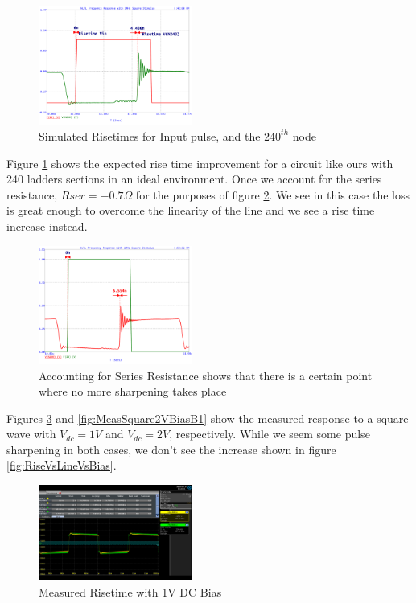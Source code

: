 \documentclass[journal]{IEEEtran} \usepackage[english]{babel}
\begin{document}
\begin{figure}[htb]
\centering
\includegraphics[width=0.45\textwidth]{Probed_Input_N10_N240_NoSeriesResistance}
\caption{Simulated Risetimes for Input pulse, and the $240^{th}$ node}
\label{fig:probedNoResistance}
\end{figure}

Figure \ref{fig:probedNoResistance} shows the expected rise time improvement for
a circuit like ours with 240 ladders sections in an ideal environment. Once we
account for the series resistance, $Rser = -0.7\Omega$ for the purposes of
figure \ref{fig:probedWithResistance}. We see in this case the loss is great
enough to overcome the linearity of the line and we see a rise time increase
instead. 

\begin{figure}[htb]
\centering
\includegraphics[width=0.45\textwidth]{Probed_Input_N10_N240_With_SeriesResistance}
\caption{Accounting for Series Resistance shows that there is a certain point where no more sharpening takes place}
\label{fig:probedWithResistance}
\end{figure}

Figures \ref{fig:MeasuredSquare1VBiasB1} and \ref{fig:MeasSquare2VBiasB1} show
the measured response to a square wave with $V_{dc} = 1V$ and $V_{dc} = 2V$,
respectively. While we seem some pulse sharpening in both cases, we don't see
the increase shown in figure \ref{fig:RiseVsLineVsBias}.


\begin{figure}[htb]
\centering
\includegraphics[width=0.45\textwidth]{MeasuredSquare1VBiasB1.png}
\caption{Measured Risetime with 1V DC Bias}
\label{fig:MeasuredSquare1VBiasB1}
\end{figure}
\end{document}
